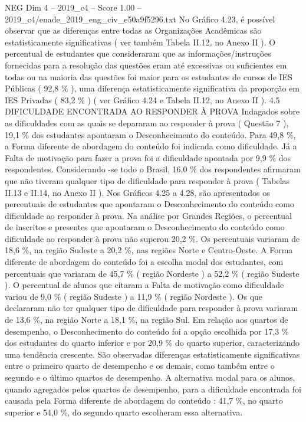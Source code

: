 \begin{textsample}{NEG Dim 4 – 2019\_c4 – Score 1.00 – 2019\_c4/enade\_2019\_eng\_civ\_e50a9f5296.txt}
No Gráfico 4.23, é possível observar que as diferenças entre todas as Organizações Acadêmicas são estatisticamente significativas ( ver também Tabela II.12, no Anexo II ).
O percentual de estudantes que consideraram que as informações/instruções fornecidas para a resolução das questões eram até excessivas ou suficientes em todas ou na maioria das questões foi maior para os estudantes de cursos de IES Públicas ( 92,8 \% ), uma diferença estatisticamente significativa da proporção em IES Privadas ( 83,2 \% ) ( ver Gráfico 4.24 e Tabela II.12, no Anexo II ). 4.5 DIFICULDADE ENCONTRADA AO RESPONDER À PROVA Indagados sobre as dificuldades com as quais se depararam ao responder à prova ( Questão 7 ), 19,1 \% dos estudantes apontaram o Desconhecimento do conteúdo.
Para 49,8 \%, a Forma diferente de abordagem do conteúdo foi indicada como dificuldade.
Já a Falta de motivação para fazer a prova foi a dificuldade apontada por 9,9 \% dos respondentes.
Considerando -se todo o Brasil, 16,0 \% dos respondentes afirmaram que não tiveram qualquer tipo de dificuldade para responder à prova ( Tabelas II.13 e II.14, no Anexo II ).
Nos Gráficos 4.25 a 4.28, são apresentados os percentuais de estudantes que apontaram o Desconhecimento do conteúdo como dificuldade ao responder à prova.
Na análise por Grandes Regiões, o percentual de inscritos e presentes que apontaram o Desconhecimento do conteúdo como dificuldade ao responder à prova não superou 20,2 \%.
Os percentuais variaram de 18,6 \%, na região Sudeste a 20,2 \%, nas regiões Norte e Centro-Oeste.
A Forma diferente de abordagem do conteúdo foi a escolha modal dos estudantes, com percentuais que variaram de 45,7 \% ( região Nordeste ) a 52,2 \% ( região Sudeste ).
O percentual de alunos que citaram a Falta de motivação como dificuldade variou de 9,0 \% ( região Sudeste ) a 11,9 \% ( região Nordeste ).
Os que declararam não ter qualquer tipo de dificuldade para responder à prova variaram de 13,6 \%, na região Norte a 18,1 \%, na região Sul.
Em relação aos quartos de desempenho, o Desconhecimento do conteúdo foi a opção escolhida por 17,3 \% dos estudantes do quarto inferior e por 20,9 \% do quarto superior, caracterizando uma tendência crescente.
São observadas diferenças estatisticamente significativas entre o primeiro quarto de desempenho e os demais, como também entre o segundo e o último quartos de desempenho.
A alternativa modal para os alunos, quando agregados pelos quartos de desempenho, para a dificuldade encontrada foi causada pela Forma diferente de abordagem do conteúdo : 41,7 \%, no quarto superior e 54,0 \%, do segundo quarto escolheram essa alternativa.

\end{textsample}
